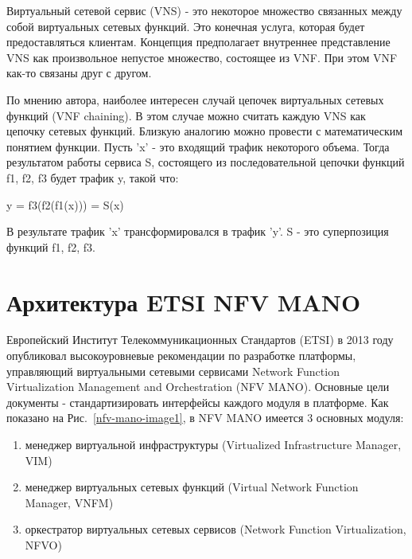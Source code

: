 \documentclass[oneside,final,14pt,a4paper]{extreport}
\begin{document}
Виртуальный сетевой сервис (VNS) - это некоторое множество связанных между собой виртуальных сетевых функций. Это конечная услуга, которая будет предоставляться клиентам. Концепция предполагает внутреннее представление VNS как произвольное непустое множество, состоящее из VNF. При этом VNF как-то связаны друг с другом.

По мнению автора, наиболее интересен случай цепочек виртуальных сетевых функций (VNF chaining). В этом случае можно считать каждую VNS как цепочку сетевых функций. Близкую аналогию можно провести с математическим понятием функции. Пусть 'x' - это входящий трафик некоторого объема. Тогда результатом работы сервиса S, состоящего из последовательной цепочки функций f1, f2, f3 будет трафик y, такой что:

y = f3(f2(f1(x))) = S(x)

В результате трафик 'x' трансформировался в трафик 'y'. S - это суперпозиция функций f1, f2, f3.


\section{Архитектура ETSI NFV MANO}
Европейский Институт Телекоммуникационных Стандартов (ETSI) в 2013 году опубликовал высокоуровневые рекомендации по разработке платформы, управляющий виртуальными сетевыми сервисами Network Function Virtualization Management and Orchestration (NFV MANO). Основные цели документы - стандартизировать интерфейсы каждого модуля в платформе.\cite{nfv-mano-state1} Как показано на Рис.~\ref{nfv-mano-image1}, в NFV MANO имеется 3 основных модуля:

\begin{enumerate}
	\item менеджер виртуальной инфраструктуры (Virtualized Infrastructure Manager, VIM)
	\item менеджер виртуальных сетевых функций (Virtual Network Function Manager, VNFM)
	\item оркестратор виртуальных сетевых сервисов (Network Function Virtualization, NFVO)
\end{enumerate}
\end{document}
